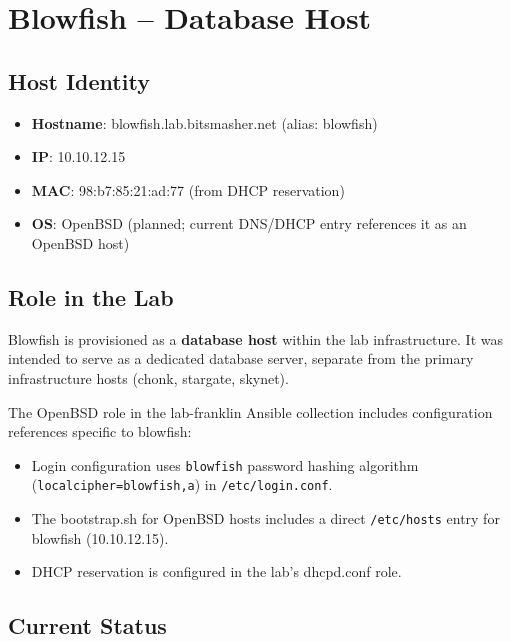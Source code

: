 \section{Blowfish -- Database Host}

\subsection{Host Identity}

\begin{itemize}
    \item \textbf{Hostname}: blowfish.lab.bitsmasher.net (alias: blowfish)
    
    \item \textbf{IP}: 10.10.12.15
    
    \item \textbf{MAC}: 98:b7:85:21:ad:77 (from DHCP reservation)
    
    \item \textbf{OS}: OpenBSD (planned; current DNS/DHCP entry references it as an OpenBSD host)
\end{itemize}

\subsection{Role in the Lab}

Blowfish is provisioned as a \textbf{database host} within the lab infrastructure. It was intended to serve as a dedicated database server, separate from the primary infrastructure hosts (chonk, stargate, skynet).

The OpenBSD role in the lab-franklin Ansible collection includes configuration references specific to blowfish:
\begin{itemize}
    \item Login configuration uses \texttt{blowfish} password hashing algorithm (\texttt{localcipher=blowfish,a}) in \texttt{/etc/login.conf}.
    
    \item The bootstrap.sh for OpenBSD hosts includes a direct \texttt{/etc/hosts} entry for blowfish (10.10.12.15).
    
    \item DHCP reservation is configured in the lab's dhcpd.conf role.
\end{itemize}

\subsection{Current Status}

